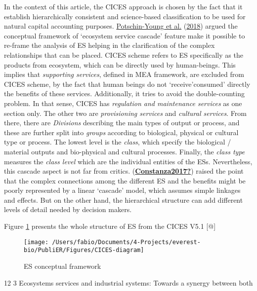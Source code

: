 \documentclass[]{elsarticle} %
\makeatletter
\renewcommand\subsection{\@startsection{subsection}{2}{\z@}%
         {12\p@ \@plus 6\p@ \@minus 3\p@}%
         {3\p@ \@plus 6\p@ \@minus 3\p@}%
         {\normalfont\normalsize\itshape\bfseries}}
\makeatother
\begin{document}
In the context of this article, the CICES approach is chosen by the fact that it establish hierarchically consistent and science-based classification to be used for natural capital accounting purposes.
\protect\hyperlink{ref-Potschin-Young2018}{Potschin-Young et al.} (\protect\hyperlink{ref-Potschin-Young2018}{2018}) argued the conceptual framework of `ecosystem service cascade' feature make it possible to re-frame the analysis of ES helping in the clarification of the complex relationships that can be placed.
CICES scheme refers to ES specifically as the products from ecosystem, which can be directly used by human-beings.
This implies that \emph{supporting services}, defined in MEA framework, are excluded from CICES scheme, by the fact that human beings do not `receive'consumed' directly the benefits of these services.
Additionally, it tries to avoid the double-counting problem.
In that sense, CICES has \emph{regulation and maintenance services} as one section only.
The other two are \emph{provisioning services} and \emph{cultural services}.
From there, there are \emph{Divisions} describing the main types of output or process, and these are further split into \emph{groups} according to biological, physical or cultural type or process.
The lowest level is the \emph{class}, which specify the biological / material outputs and bio-physical and cultural processes.
Finally, the \emph{class type} measures the \emph{class level} which are the individual entities of the ESs.
Nevertheless, this cascade aspect is not far from critics.
(\protect\hyperlink{ref-Constanza2017}{\textbf{Constanza2017?}}) raised the point that the complex connections among the different ES and the benefits might be poorly represented by a linear `cascade' model, which assumes simple linkages and effects.
But on the other hand, the hierarchical structure can add different levels of detail needed by decision makers.

Figure \ref{fig:ES-CICES} presents the whole structure of ES from the CICES V5.1 {[}@{]}

\begin{figure}[!ht]

{\centering \texttt{[image: /Users/fabio/Documents/4-Projects/everest-bio/PubliER/Figures/CICES-diagram]} 

}

\caption{ES conceptual framework}\label{fig:ES-CICES}
\end{figure}

\hypertarget{ecosystems-services-and-industrial-systems-towards-a-synergy-between-both}{%
\subsection{Ecosystems services and industrial systems: Towards a synergy between both}\label{ecosystems-services-and-industrial-systems-towards-a-synergy-between-both}}
\end{document}

